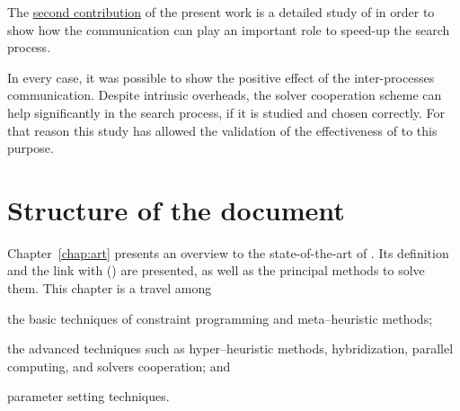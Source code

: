 The \underline{second contribution} of the present work is a detailed study of \commstrs{} %
in order to show how the communication can play an important role to speed-up the search process.





In every case, it was possible to show the positive effect of the inter-processes communication. Despite intrinsic overheads, the solver cooperation scheme can help significantly in the search process, if it is studied and chosen correctly. For that reason this study has allowed the validation of the effectiveness of \posl{} to this purpose.

\section{Structure of the document}

Chapter~\ref{chap:art} presents an overview to the state-of-the-art of \COPs{}. Its definition and the link with \CSPs{} (\csp) are presented, as well as the principal methods to solve them. This chapter is a travel among \begin{inparaenum}[1)] \item the basic techniques of constraint programming and meta--heuristic methods; \item the advanced techniques such as hyper--heuristic methods, hybridization, parallel computing, and solvers cooperation; and \item parameter setting techniques. \end{inparaenum}

